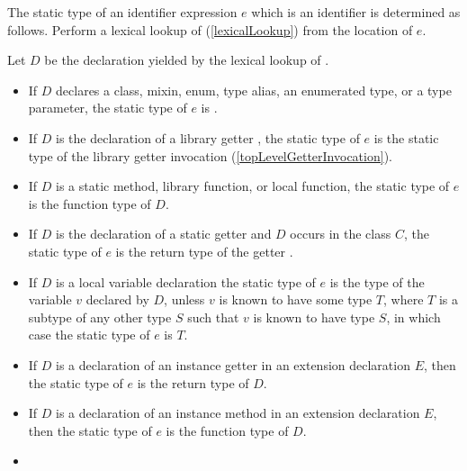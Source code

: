 \documentclass[makeidx]{article}
\begin{document}
{\LMHash{}%
The static type of an identifier expression $e$ which is an identifier \id{}
is determined as follows.
Perform a lexical lookup of \id{}
(\ref{lexicalLookup})
from the location of $e$.

\LMHash{}%
Let $D$ be the declaration yielded by the lexical lookup of \id.

\begin{itemize}
\item
  If $D$ declares a class, mixin, enum, type alias, an enumerated type,
  or a type parameter,
  the static type of $e$ is .
\item
  If $D$ is the declaration of a library getter
  ,
  the static type of $e$ is the static type of the
  library getter invocation \id{}
  (\ref{topLevelGetterInvocation}).
\item
  If $D$ is a static method, library function, or local function,
  the static type of $e$ is the function type of $D$.

\item
  If $D$ is the declaration of a static getter
  and $D$ occurs in the class $C$,
  the static type of $e$ is the return type of the getter
  .
\item
  If $D$ is a local variable declaration
  the static type of $e$ is the type of the variable $v$ declared by $D$,
  unless $v$ is known to have some type $T$,
  where $T$ is a subtype of any other type $S$
  such that $v$ is known to have type $S$,
  in which case the static type of $e$ is $T$.
\item
  If $D$ is a declaration of an instance getter
  in an extension declaration $E$,
  then the static type of $e$ is the return type of $D$.
\item
  If $D$ is a declaration of an instance method
  in an extension declaration $E$,
  then the static type of $e$ is the function type of $D$.
\item
\end{itemize}
\vspace{-1ex}
\EndCase

}
\end{document}
